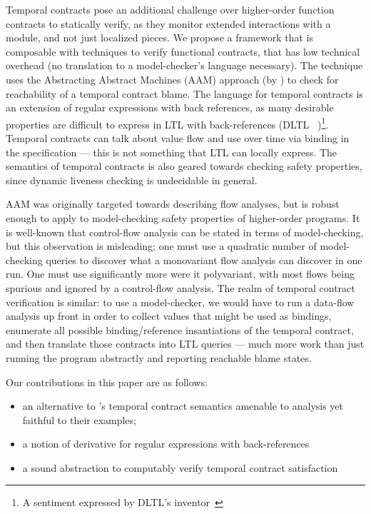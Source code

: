 Temporal contracts pose an additional challenge over higher-order function contracts to statically verify, as they monitor extended interactions with a module, and not just localized pieces.
%
We propose a framework that is composable with techniques to verify functional contracts, that has low technical overhead (\eg no translation to a model-checker's language necessary).
%
The technique uses the Abstracting Abstract Machines (AAM) approach (by \citet{dvanhorn:VanHorn2010Abstracting}) to check for reachability of a temporal contract blame.
%
The language for temporal contracts is an extension of regular expressions with back references, as many desirable properties are difficult to express in LTL with back-references (DLTL ~\cite{ianjohnson:jlo})\footnote{A sentiment expressed by DLTL's inventor~\citep{boddenadmission}}.
%
Temporal contracts can talk about value flow and use over time via binding in the specification --- this is not something that LTL can locally express.
%
The semantics of temporal contracts is also geared towards checking safety properties, since dynamic liveness checking is undecidable in general.

AAM was originally targeted towards describing flow analyses, but is robust enough to apply to model-checking safety properties of higher-order programs.
%
It is well-known that control-flow analysis can be stated in terms of model-checking, but this observation is misleading; one must use a quadratic number of model-checking queries to discover what a monovariant flow analysis can discover in one run.
%
One must use significantly more were it polyvariant, with most flows being spurious and ignored by a control-flow analysis.
%
The realm of temporal contract verification is similar: to use a model-checker, we would have to run a data-flow analysis up front in order to collect values that might be used as bindings, enumerate all possible binding/reference insantiations of the temporal contract, and then translate those contracts into LTL queries --- much more work than just running the program abstractly and reporting reachable blame states.
%

Our contributions in this paper are as follows:
\begin{itemize}
 \item{an alternative to \dfm's temporal contract semantics amenable to analysis yet faithful to their examples;}
 \item{a notion of derivative for regular expressions with back-references}
 \item{a sound abstraction to computably verify temporal contract satisfaction}
\end{itemize}

